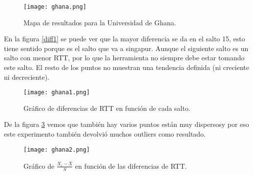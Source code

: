 \begin{figure}[H]
\texttt{[image: ghana.png]}
\caption{Mapa de resultados para la Universidad de Ghana.}
\label{mapa2}
\end{figure}

En la figura \ref{diff1} se puede ver que la mayor diferencia se da en el salto 15, esto tiene sentido porque es el salto que va a singapur. Aunque el siguiente salto es un salto con menor RTT, por lo que la herramienta no siempre debe estar tomando este salto. El resto de los puntos no muestran una tendencia definida (ni creciente ni decreciente).


\begin{figure}[H]
\centering
\texttt{[image: ghana1.png]}
\caption{Gráfico de diferencias de RTT en función de cada salto.}
\label{diff2}
\end{figure}

De la figura \ref{sdev2} vemos que también hay varios puntos están muy dispersosy por eso este experimento también devolvió muchos outliers como resultado.

\begin{figure}[H]
\centering
\texttt{[image: ghana2.png]}
\caption{Gráfico de $\frac{X_i - \bar{X}}{S}$ en función de las diferencias de RTT.}
\label{sdev2}
\end{figure}